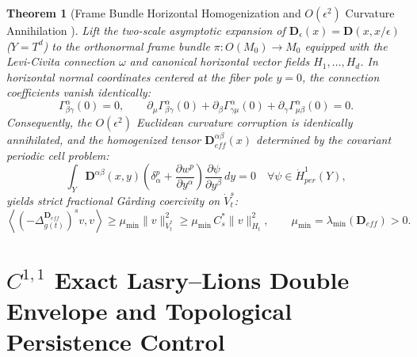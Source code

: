 \documentclass[11pt,a4paper,reqno]{article}
\def\mathrm#1{#1}%
\def\mathcal#1{#1}%
\def\mathbb#1{#1}%
\theoremstyle{plain}
\newtheorem{theorem}{Theorem}[section]
\theoremstyle{definition}
\theoremstyle{remark}
\numberwithin{equation}{section}
\begin{document}
\begin{theorem}[Frame Bundle Horizontal Homogenization and $\mathcal{O}(\epsilon^2)$ Curvature Annihilation \cite{ananda2026stochastic_fluid_v2, hsu2002stochastic}]\label{thm:frame_bundle_homog}
Lift the two-scale asymptotic expansion of $\mathbf{D}_\epsilon(x) = \mathbf{D}(x, x/\epsilon)$ ($Y = \mathbb{T}^d$) to the orthonormal frame bundle $\pi : O(\mathcal{M}_0) \to \mathcal{M}_0$ equipped with the Levi-Civita connection $\omega$ and canonical horizontal vector fields $H_1, \dots, H_d$. In horizontal normal coordinates centered at the fiber pole $y = 0$, the connection coefficients vanish identically:
\begin{equation}\label{eq:christoffel_pole_zero}
  \Gamma_{\beta\gamma}^\alpha(0) = 0, \qquad \partial_\mu \Gamma_{\beta\gamma}^\alpha(0) + \partial_\beta \Gamma_{\gamma\mu}^\alpha(0) + \partial_\gamma \Gamma_{\mu\beta}^\alpha(0) = 0.
\end{equation}
Consequently, the $\mathcal{O}(\epsilon^2)$ Euclidean curvature corruption is identically annihilated, and the homogenized tensor $\mathbf{D}_{\mathrm{eff}}^{\alpha\beta}(x)$ determined by the covariant periodic cell problem:
\begin{equation}\label{eq:cell_problem}
  \int_{Y} \mathbf{D}^{\alpha\beta}(x, y) \left( \delta_\alpha^p + \frac{\partial w^p}{\partial y^\alpha} \right) \frac{\partial \psi}{\partial y^\beta} \,\mathrm{d}y = 0 \quad \forall \psi \in \dot{H}_{\mathrm{per}}^1(Y),
\end{equation}
yields strict fractional G\aa rding coercivity on $\dot{V}_t^s$:
\begin{equation}\label{eq:garding_coercivity}
  \left\langle (-\Delta_{g(t)}^{\mathbf{D}_{\mathrm{eff}}})^s v, v \right\rangle \ge \mu_{\min} \|v\|_{\dot{V}_t^s}^2 \ge \mu_{\min}\,\mathcal{C}_s^* \|v\|_{\dot{H}_t}^2, \qquad \mu_{\min} = \lambda_{\min}(\mathbf{D}_{\mathrm{eff}}) > 0.
\end{equation}
\end{theorem}

\section{\texorpdfstring{$C^{1,1}$}{C1,1} Exact Lasry--Lions Double Envelope and Topological Persistence Control}
\label{sec:lasry_lions}
\end{document}
